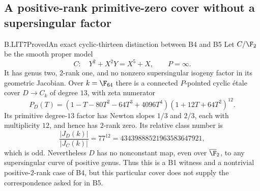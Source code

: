 \subsection{A positive-rank primitive-zero cover without a supersingular factor}

\begin{claim}{B.LIT7}{Proved}{An exact cyclic-thirteen distinction between B4 and B5}
Let $C/\F_2$ be the smooth proper model
\[
 C:\quad Y^2+X^2Y=X^5+X,
 \qquad P=\infty.
\]
It has genus two, $2$-rank one, and no nonzero supersingular
isogeny factor in its geometric Jacobian. Over $k=\F_{64}$
there is a connected $P$-pointed cyclic \'etale cover
$D\to C_k$ of degree $13$, with zeta numerator
\[
 P_D(T)=
 (1-T-80T^2-64T^3+4096T^4)
 (1+12T+64T^2)^{12}.
 \tag{B.LIT.7}
\]
Its primitive degree-$13$ factor has Newton slopes
$1/3$ and $2/3$, each with multiplicity $12$, and hence
has $2$-rank zero. Its relative class number is
\[
 \frac{|J_D(k)|}{|J_C(k)|}=77^{12}
       =43439888521963583647921,
\]
which is odd. Nevertheless $D$ has no nonconstant map,
even over $\overline{\F}_2$, to any supersingular curve
of positive genus. Thus this is a B1 witness and a
nontrivial positive-$2$-rank case of B4, but this particular
cover does not supply the correspondence asked for in B5.
\end{claim}

